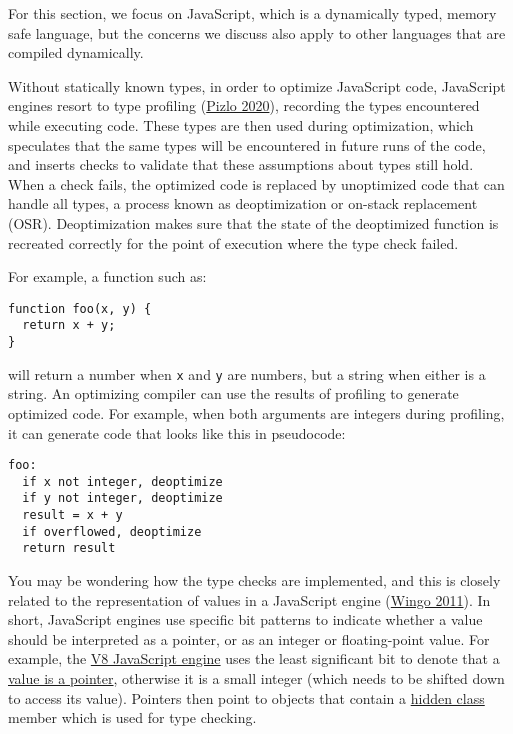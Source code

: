 \documentclass[
  a4paper,
]{report}
\begin{document}
For this section, we focus on JavaScript, which is a dynamically typed,
memory safe language, but the concerns we discuss also apply to other
languages that are compiled dynamically.

Without statically known types, in order to optimize JavaScript code,
JavaScript engines resort to type profiling
(\protect\hyperlink{ref-Pizlo2020}{Pizlo 2020}), recording the types
encountered while executing code. These types are then used during
optimization, which speculates that the same types will be encountered
in future runs of the code, and inserts checks to validate that these
assumptions about types still hold. When a check fails, the optimized
code is replaced by unoptimized code that can handle all types, a
process known as deoptimization or on-stack
replacement (OSR). Deoptimization
makes sure that the state of the deoptimized function is recreated
correctly for the point of execution where the type check failed.

For example, a function such as:

\begin{verbatim}
function foo(x, y) {
  return x + y;
}
\end{verbatim}

will return a number when \texttt{x} and \texttt{y} are numbers, but a
string when either is a string. An optimizing compiler can use the
results of profiling to generate optimized code. For example, when both
arguments are integers during profiling, it can generate code that looks
like this in pseudocode:

\begin{verbatim}
foo:
  if x not integer, deoptimize
  if y not integer, deoptimize
  result = x + y
  if overflowed, deoptimize
  return result
\end{verbatim}

You may be wondering how the type checks are implemented, and this is
closely related to the representation of values in a JavaScript engine
(\protect\hyperlink{ref-Wingo2011}{Wingo 2011}). In short, JavaScript
engines use specific bit patterns to indicate whether a value should be
interpreted as a pointer, or as an integer or floating-point value. For
example, the \href{https://v8.dev/}{V8 JavaScript engine} uses the least
significant bit to denote that a
\href{https://v8.dev/blog/pointer-compression\#value-tagging-in-v8}{value
is a pointer}, otherwise it is a small integer (which needs to be
shifted down to access its value). Pointers then point to objects that
contain a \href{https://v8.dev/docs/hidden-classes}{hidden class} member
which is used for type checking.
\end{document}
